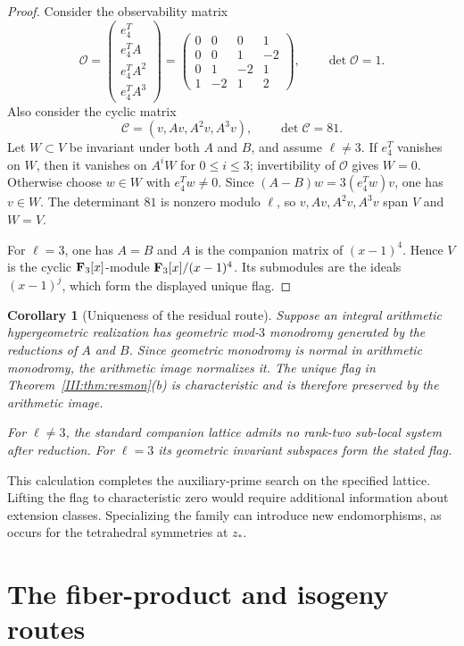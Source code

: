 \documentclass[11pt,letterpaper]{article}
\newtheorem{corollary}[theorem]{Corollary}
\theoremstyle{definition}
\theoremstyle{remark}
\begin{document}
\begin{proof}
Consider the observability matrix
\[
 \mathcal O=\begin{pmatrix}
 e_4^T\\e_4^TA\\e_4^TA^2\\e_4^TA^3
 \end{pmatrix}
 =\begin{pmatrix}
0&0&0&1\\0&0&1&-2\\0&1&-2&1\\1&-2&1&2
\end{pmatrix},
\qquad \det\mathcal O=1.
\]
Also consider the cyclic matrix
\[
 \mathcal C=(v,Av,A^2v,A^3v),
 \qquad \det\mathcal C=81.
\]
Let $W\subset V$ be invariant under both $A$ and $B$, and assume $\ell\neq3$.
If $e_4^T$ vanishes on $W$, then it vanishes on $A^iW$ for $0\le i\le3$; invertibility of
$\mathcal O$ gives $W=0$.  Otherwise choose $w\in W$ with $e_4^Tw\neq0$.  Since
$(A-B)w=3(e_4^Tw)v$, one has $v\in W$.  The determinant $81$ is nonzero modulo $\ell$, so
$v,Av,A^2v,A^3v$ span $V$ and $W=V$.

For $\ell=3$, one has $A=B$ and $A$ is the companion matrix of $(x-1)^4$.  Hence
$V$ is the cyclic $\mathbf F_3[x]$-module $\mathbf F_3[x]/(x-1)^4$.  Its submodules are the ideals
$(x-1)^j$, which form the displayed unique flag.
\end{proof}

\begin{corollary}[Uniqueness of the residual route]\label{III:cor:normalizer}
Suppose an integral arithmetic hypergeometric realization has geometric mod-$3$ monodromy generated by
the reductions of $A$ and $B$.  Since geometric monodromy is normal in arithmetic monodromy, the
arithmetic image normalizes it.  The unique flag in Theorem~\ref{III:thm:resmon}(b) is characteristic and is
therefore preserved by the arithmetic image.


For $\ell\neq3$, the standard companion lattice admits no rank-two
sub-local system after reduction. For $\ell=3$ its geometric
invariant subspaces form the stated flag.
\end{corollary}

This calculation completes the auxiliary-prime search on the specified
lattice. Lifting the flag to characteristic zero would require
additional information about extension classes. Specializing the family
can introduce new endomorphisms, as occurs for the tetrahedral
symmetries at $z_*$.

\section{The fiber-product and isogeny routes}
\end{document}
